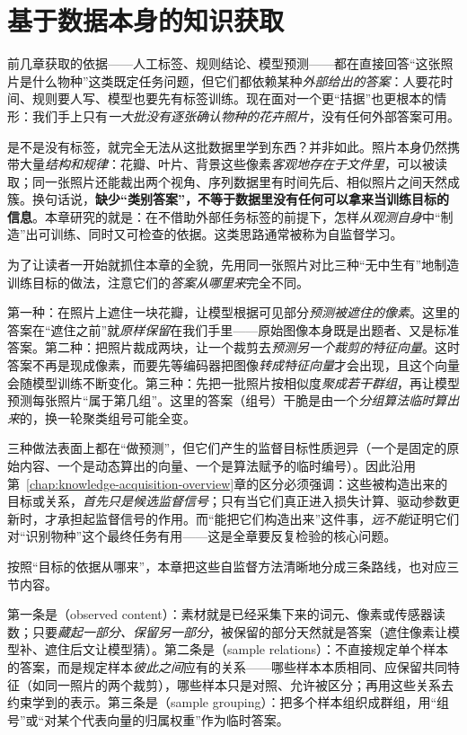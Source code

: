 \chapter{基于数据本身的知识获取}
\label{chap:data-derived-knowledge-acquisition}

前几章获取的依据——人工标签、规则结论、模型预测——都在直接回答“这张照片是什么物种”这类既定任务问题，但它们都依赖某种\emph{外部给出的答案}：人要花时间、规则要人写、模型也要先有标签训练。现在面对一个更“拮据”也更根本的情形：我们手上只有\emph{一大批没有逐张确认物种的花卉照片}，没有任何外部答案可用。

是不是没有标签，就完全无法从这批数据里学到东西？并非如此。照片本身仍然携带大量\emph{结构和规律}：花瓣、叶片、背景这些像素\emph{客观地存在于文件里}，可以被读取；同一张照片还能裁出两个视角、序列数据里有时间先后、相似照片之间天然成簇。换句话说，\textbf{缺少“类别答案”，不等于数据里没有任何可以拿来当训练目标的信息}。本章研究的就是：在不借助外部任务标签的前提下，怎样\emph{从观测自身}中“制造”出可训练、同时又可检查的依据。这类思路通常被称为自监督学习。

为了让读者一开始就抓住本章的全貌，先用同一张照片对比三种“无中生有”地制造训练目标的做法，注意它们的\emph{答案从哪里来}完全不同。

第一种：在照片上遮住一块花瓣，让模型根据可见部分\emph{预测被遮住的像素}。这里的答案在“遮住之前”就\emph{原样保留}在我们手里——原始图像本身既是出题者、又是标准答案。第二种：把照片裁成两块，让一个裁剪去\emph{预测另一个裁剪的特征向量}。这时答案不再是现成像素，而要先等编码器把图像\emph{转成特征向量}才会出现，且这个向量会随模型训练不断变化。第三种：先把一批照片按相似度\emph{聚成若干群组}，再让模型预测每张照片“属于第几组”。这里的答案（组号）干脆是由一个\emph{分组算法临时算出来}的，换一轮聚类组号可能全变。

三种做法表面上都在“做预测”，但它们产生的监督目标性质迥异（一个是固定的原始内容、一个是动态算出的向量、一个是算法赋予的临时编号）。因此沿用第~\ref{chap:knowledge-acquisition-overview}章的区分必须强调：这些被构造出来的目标或关系，\emph{首先只是候选监督信号}；只有当它们真正进入损失计算、驱动参数更新时，才承担起监督信号的作用。而“能把它们构造出来”这件事，\emph{远不能}证明它们对“识别物种”这个最终任务有用——这是全章要反复检验的核心问题。

按照“目标的依据从哪来”，本章把这些自监督方法清晰地分成三条路线，也对应三节内容。

第一条是（observed content）：素材就是已经采集下来的词元、像素或传感器读数；只要\emph{藏起一部分、保留另一部分}，被保留的部分天然就是答案（遮住像素让模型补、遮住后文让模型猜）。第二条是（sample relations）：不直接规定单个样本的答案，而是规定样本\emph{彼此之间}应有的关系——哪些样本本质相同、应保留共同特征（如同一照片的两个裁剪），哪些样本只是对照、允许被区分；再用这些关系去约束学到的表示。第三条是（sample grouping）：把多个样本组织成群组，用“组号”或“对某个代表向量的归属权重”作为临时答案。

